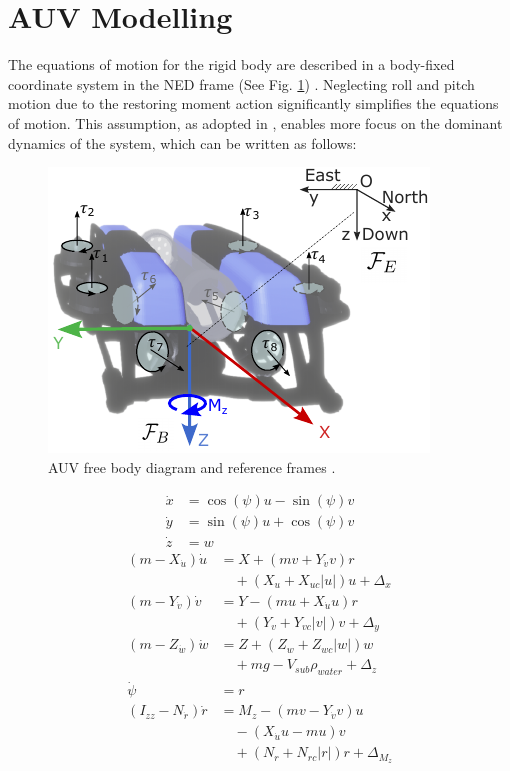 \section{AUV Modelling}
\label{sec:model}


The equations of motion for the rigid body are described in a body-fixed coordinate system in the \ac{NED} frame (See Fig. \ref{fig:rov}) \cite{fossen}. Neglecting roll and pitch motion due to the restoring moment action significantly simplifies the equations of motion. This assumption, as adopted in \cite{shen2018path, heshmati2019robust}, enables more focus on the dominant dynamics of the system, which can be written as follows:

\begin{figure}[b!]
	\centering	\includegraphics[width=0.5\linewidth]{figures/brov.pdf}
	\caption{\ac{AUV} free body diagram and reference frames \cite{unav}.}
	\label{fig:rov}
\end{figure}


\begin{align}
\dot{x} &= \cos(\psi) u - \sin(\psi)  v \label{eq:xdot}\\
\dot{y} &= \sin(\psi)  u + \cos(\psi)  v \label{eq:ydot}\\
\dot{z} &= w \label{eq:zdot}
\end{align}
\begin{align}
(m - X_{\dot{u}})\dot{u} &= X + (m  v + Y_{\dot{v}}  v)  r \nonumber \\
&\quad + (X_u + X_{uc}  |u| )  u + \Delta_{x} \label{eq:udot}\\
(m - Y_{\dot{v}})\dot{v} &= Y - (m  u + X_{\dot{u}}  u)  r \nonumber \\
&\quad + (Y_v + Y_{vc}  |v|)  v + \Delta_{y} \label{eq:vdot}\\
(m - Z_{\dot{w}}) \dot{w} &= Z + (Z_w + Z_{wc}  |w|)w \nonumber \\
&\quad + m  g - V_{sub} \rho_{water}  + \Delta_{z}\label{eq:wdot}\\
\dot{\psi} &= r \label{eq:psidot}\\
(I_{zz} - N_{\dot{r}}) \dot{r} &= M_z - (m  v - Y_{\dot{v}}  v)  u \nonumber \\
&\quad - (X_{\dot{u}}  u - m  u)  v  \nonumber \\
&\quad + (N_r + N_{rc}  |r|)  r + \Delta_{M_z} \label{eq:rdot}
\end{align}

